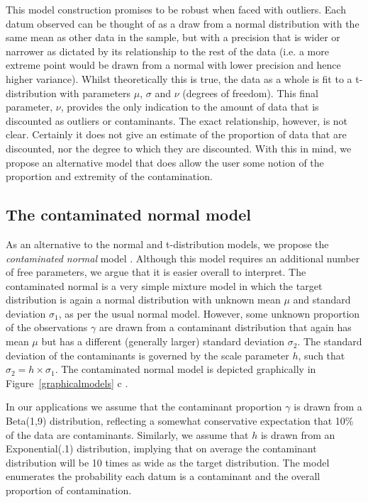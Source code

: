 \documentclass[doc]{apa6}
\begin{document}
{This model construction promises to be robust when faced with outliers. Each datum observed can be thought of as a draw from a normal distribution with the same mean as other data in the sample, but with a precision that is wider or narrower as dictated by its relationship to the rest of the data (i.e. a more extreme point would be drawn from a normal with lower precision and hence higher variance). Whilst theoretically this is true, the data as a whole is fit to a t-distribution with parameters $\mu$, $\sigma$ and $\nu$ (degrees of freedom). This final parameter, $\nu$, provides the only indication to the amount of data that is discounted as outliers or contaminants. The exact relationship, however, is not clear. Certainly it does not give an estimate of the proportion of data that are discounted, nor the degree to which they are discounted. With this in mind, we propose an alternative model that does allow the user some notion of the proportion and extremity of the contamination.


\subsection{The contaminated normal model}

As an alternative to the normal and t-distribution models, we propose the {\it contaminated normal} model \parencite[e.g.,][]{tukey_survey_1960}. Although this model requires an additional number of free parameters, we argue that it is easier overall to interpret. The contaminated normal is a very simple mixture model in which the target distribution is again a normal distribution with unknown mean $\mu$ and standard deviation $\sigma_1$, as per the usual normal model. However, some unknown proportion of the observations $\gamma$ are drawn from a contaminant distribution that again has mean $\mu$ but has a different (generally larger) standard deviation $\sigma_2$. The standard deviation of the contaminants is governed by the scale parameter $h$, such that $\sigma_2 = h \times \sigma_1$. The contaminated normal model is depicted graphically in Figure~\ref{graphicalmodels}  c .

In our applications we assume that the contaminant proportion $\gamma$ is drawn from a Beta(1,9) distribution, reflecting a  somewhat conservative expectation that 10\% of the data are contaminants. Similarly, we assume that $h$ is drawn from an Exponential(.1) distribution, implying that on average the contaminant distribution will be 10 times as wide as the target distribution.   The model enumerates the probability each datum is a contaminant and the overall proportion of contamination.

}
\end{document}
